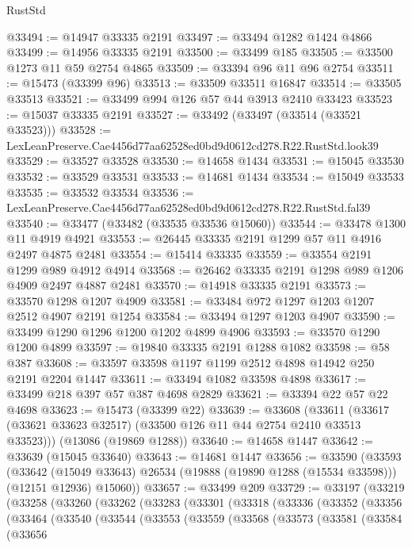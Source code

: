 \begin{lexlean}{RustStd}
\begin{coremodule}
@33494 := @14947 @33335 @2191
@33497 := @33494 @1282 @1424 @4866
@33499 := @14956 @33335 @2191
@33500 := @33499 @185
@33505 := @33500 @1273 @11 @59 @2754 @4865
@33509 := @33394 @96 @11 @96 @2754
@33511 := @15473 (@33399 @96)
@33513 := @33509 @33511 @16847
@33514 := @33505 @33513
@33521 := @33499 @994 @126 @57 @44 @3913 @2410 @33423
@33523 := @15037 @33335 @2191
@33527 := @33492 (@33497 (@33514 (@33521 @33523)))
@33528 := LexLeanPreserve.Cae4456d77aa62528ed0bd9d0612cd278.R22.RustStd.look39
@33529 := @33527 @33528
@33530 := @14658 @1434
@33531 := @15045 @33530
@33532 := @33529 @33531
@33533 := @14681 @1434
@33534 := @15049 @33533
@33535 := @33532 @33534
@33536 := LexLeanPreserve.Cae4456d77aa62528ed0bd9d0612cd278.R22.RustStd.fal39
@33540 := @33477 (@33482 (@33535 @33536 @15060))
@33544 := @33478 @1300 @11 @4919 @4921
@33553 := @26445 @33335 @2191 @1299 @57 @11 @4916 @2497 @4875 @2481
@33554 := @15414 @33335
@33559 := @33554 @2191 @1299 @989 @4912 @4914
@33568 := @26462 @33335 @2191 @1298 @989 @1206 @4909 @2497 @4887 @2481
@33570 := @14918 @33335 @2191
@33573 := @33570 @1298 @1207 @4909
@33581 := @33484 @972 @1297 @1203 @1207 @2512 @4907 @2191 @1254
@33584 := @33494 @1297 @1203 @4907
@33590 := @33499 @1290 @1296 @1200 @1202 @4899 @4906
@33593 := @33570 @1290 @1200 @4899
@33597 := @19840 @33335 @2191 @1288 @1082
@33598 := @58 @387
@33608 := @33597 @33598 @1197 @1199 @2512 @4898 @14942 @250 @2191 @2204 @1447
@33611 := @33494 @1082 @33598 @4898
@33617 := @33499 @218 @397 @57 @387 @4698 @2829
@33621 := @33394 @22 @57 @22 @4698
@33623 := @15473 (@33399 @22)
@33639 := @33608
    (@33611 (@33617 (@33621 @33623 @32517) (@33500 @126 @11 @44 @2754 @2410 @33513 @33523)))
    (@13086 (@19869 @1288))
@33640 := @14658 @1447
@33642 := @33639 (@15045 @33640)
@33643 := @14681 @1447
@33656 := @33590
    (@33593
      (@33642
        (@15049 @33643)
        @26534
        (@19888 (@19890 @1288 (@15534 @33598)))
        (@12151 @12936)
        @15060))
@33657 := @33499 @209
@33729 := @33197
    (@33219
      (@33258
        (@33260
          (@33262
            (@33283
              (@33301
                (@33318
                  (@33336
                    (@33352
                      (@33356
                        (@33464
                          (@33540
                            (@33544
                              (@33553
                                (@33559
                                  (@33568
                                    (@33573
                                      (@33581
                                        (@33584
                                          (@33656

\end{coremodule}
\end{lexlean}
